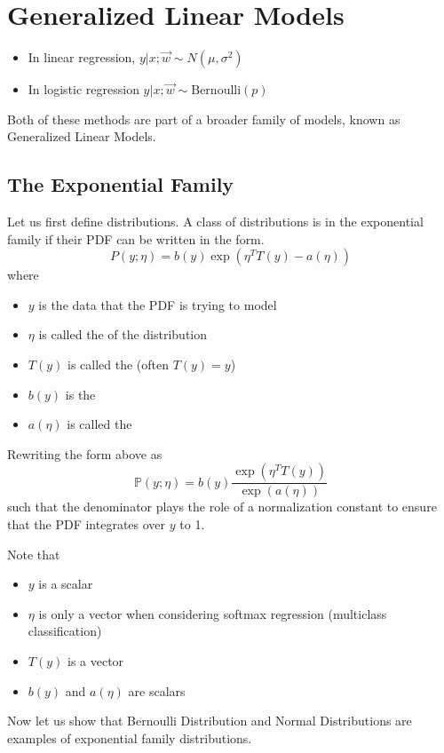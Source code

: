 \documentclass[12pt]{scrartcl}
\begin{document}
\section{Generalized Linear Models}
\begin{itemize}
    \item In linear regression, $y | x; \vec{w} \sim N(\mu, \sigma^2)$
    \item In logistic regression $y | x; \vec{w} \sim \text{Bernoulli}(p)$
\end{itemize}

Both of these methods are part of a broader family of models, known as Generalized Linear Models.

\subsection{The Exponential Family}
\begin{definition}
    Let us first define  distributions. A class of distributions is in the exponential family if their PDF can be written in the form.
\[P(y; \eta ) = b(y)\exp(\eta^TT(y) - a(\eta))\]
where
\begin{itemize}
    \item $y$ is the data that the PDF is trying to model
    \item $\eta$ is called the  of the distribution
    \item $T(y)$ is called the  (often $T(y) = y$)
    \item $b(y)$ is the 
    \item $a(\eta)$ is called the 
\end{itemize}
\end{definition}

Rewriting the form above as 
\[\mathbb{P}(y; \eta) = b(y) \frac{\exp(\eta^TT(y))}{\exp(a(\eta))}\] such that the denominator plays the role of a normalization constant to ensure that the PDF integrates over $y$ to 1.

\begin{note}
Note that 
    \begin{itemize}
        \item $y$ is a scalar
        \item $\eta$ is only a vector when considering softmax regression (multiclass classification)
        \item $T(y)$ is a vector
        \item $b(y)$ and $a(\eta)$ are scalars
    \end{itemize}
\end{note}
Now let us show that Bernoulli Distribution and Normal Distributions are examples of exponential family distributions.
\end{document}
